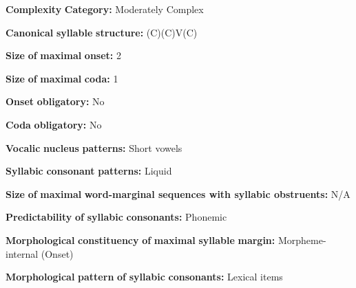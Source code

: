 \documentclass[output=paper]{langsci/langscibook}
\begin{document}
\begin{styleBody}
\textbf{Complexity} \textbf{Category:} Moderately Complex
\end{styleBody}

\begin{styleBody}
\textbf{Canonical} \textbf{syllable} \textbf{structure:} (C)(C)V(C) \citep[54-72]{Slater2003}
\end{styleBody}

\begin{styleBody}
\textbf{Size} \textbf{of} \textbf{maximal} \textbf{onset:} 2
\end{styleBody}

\begin{styleBody}
\textbf{Size} \textbf{of} \textbf{maximal} \textbf{coda:} 1
\end{styleBody}

\begin{styleBody}
\textbf{Onset} \textbf{obligatory:} No
\end{styleBody}

\begin{styleBody}
\textbf{Coda} \textbf{obligatory:} No
\end{styleBody}

\begin{styleBody}
\textbf{Vocalic} \textbf{nucleus} \textbf{patterns:} Short vowels
\end{styleBody}

\begin{styleBody}
\textbf{Syllabic} \textbf{consonant} \textbf{patterns:} Liquid
\end{styleBody}

\begin{styleBody}
\textbf{Size} \textbf{of} \textbf{maximal} \textbf{word{}-marginal sequences with syllabic obstruents:} N/A
\end{styleBody}

\begin{styleBody}
\textbf{Predictability} \textbf{of} \textbf{syllabic} \textbf{consonants:} Phonemic
\end{styleBody}

\begin{styleBody}
\textbf{Morphological} \textbf{constituency} \textbf{of} \textbf{maximal} \textbf{syllable} \textbf{margin:} Morpheme-internal (Onset)
\end{styleBody}

\begin{styleBody}
\textbf{Morphological} \textbf{pattern} \textbf{of} \textbf{syllabic} \textbf{consonants:} Lexical items
\end{styleBody}
\end{document}
